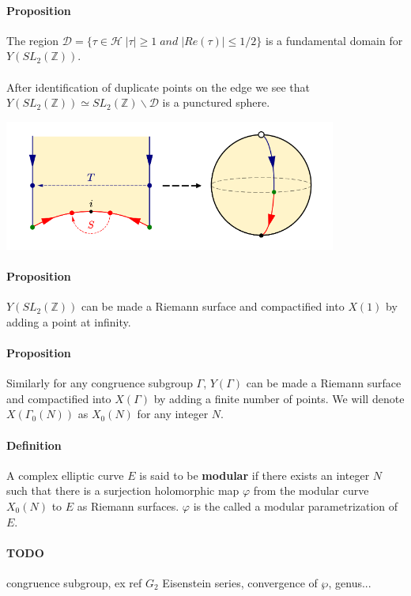 \documentclass[letterpaper,10pt]{article}
\begin{document}
\paragraph{Proposition} The region $\mathcal{D} = \{ \tau \in \mathcal{H}\;  |\tau| \geq 1 \; and \; |Re(\tau)| \leq 1/2\}$ is a fundamental domain for $Y(SL_2(\mathbb{Z}))$.

{\itshape \paragraph{} After identification of duplicate points on the edge we see that $Y(SL_2(\mathbb{Z})) \simeq SL_2(\mathbb{Z})\backslash \mathcal{D}$ is a punctured sphere.
}

\includegraphics[scale=1.0]{sphere}

\paragraph{Proposition}  $Y(SL_2(\mathbb{Z}))$ can be made a Riemann surface and compactified into $X(1)$ by adding a point at infinity.



\paragraph{Proposition} Similarly for any congruence subgroup $\Gamma$, $Y(\Gamma)$ can be made a Riemann surface and compactified into $X(\Gamma)$
 by adding a finite number of points. We will denote $X(\Gamma_0(N))$ as $X_0(N)$ for any integer $N$. 

\paragraph{Definition} A complex elliptic curve $E$ is said to be \textbf{modular} if there exists an integer $N$ such that there is a surjection holomorphic map $\varphi$ 
from the modular curve $X_0(N)$ to $E$ as Riemann surfaces. $\varphi$ is the called a modular parametrization of $E$.

\paragraph{TODO} congruence subgroup, ex ref \cite{zhou} \cite{springer} $G_2$ Eisenstein series, convergence of $\wp$, genus...


\printbibliography %
\end{document}
